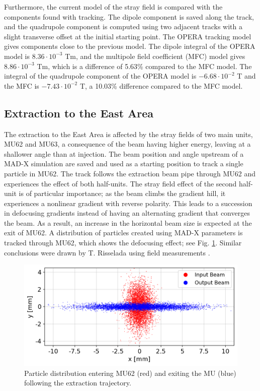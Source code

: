 \documentclass[a4paper,
               biblatex,     %
               keeplastbox,   %
               ]{jacow}
\begin{document}
Furthermore, the current model of the stray field is compared with the components found with tracking. The dipole component is saved along the track, and the quadrupole component is computed using two adjacent tracks with a slight transverse offset at the initial starting point. The OPERA tracking model gives components close to the previous model. The dipole integral of the OPERA model is $8.36\cdot10^{-3}$ Tm, and the multipole field coefficient (MFC) model gives $8.86\cdot10^{-3}$ Tm, which is a difference of 5.63\% compared to the MFC model. The integral of the quadrupole component of the OPERA model is $-6.68\cdot10^{-2}$ T and the MFC is $-7.43\cdot10^{-2}$ T, a 10.03\% difference compared to the MFC model.


\subsection{Extraction to the East Area}
The extraction to the East Area is affected by the stray fields of two main units, MU62 and MU63, a consequence of the beam having higher energy, leaving at a shallower angle than at injection. The beam position and angle upstream of a MAD-X simulation are saved and used as a starting position to track a single particle in MU62. The track follows the extraction beam pipe through MU62 and experiences the effect of both half-units. The stray field effect of the second half-unit is of particular importance; as the beam climbs the gradient hill, it experiences a nonlinear gradient with reverse polarity. This leads to a succession in defocusing gradients instead of having an alternating gradient that converges the beam. As a result, an increase in the horizontal beam size is expected at the exit of MU62. A distribution of particles created using MAD-X parameters is tracked through MU62, which shows the defocusing effect; see Fig. \ref{fig:particle_distribution}. Similar conclusions were drawn by T. Risselada using field measurements \cite{risselada_beam_nodate}.

\begin{figure}[!htb]
   \centering
   \includegraphics*[width=1.0\columnwidth]{MOPOTK030_f7.png}
   \caption{Particle distribution entering MU62 (red) and exiting the MU (blue) following the extraction trajectory.}
   \label{fig:particle_distribution}
\end{figure}
\end{document}
